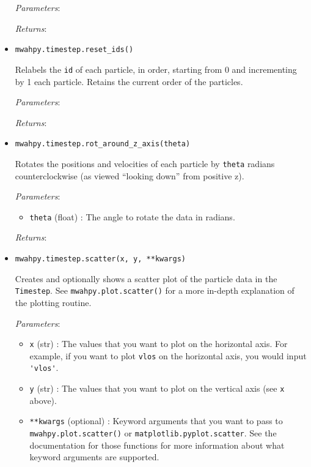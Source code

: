 \documentclass{article}
\begin{document}
\begin{itemize}
\textit{Parameters}: 

\textit{Returns}: 



\item \verb!mwahpy.timestep.reset_ids()!

Relabels the \verb!id! of each particle, in order, starting from 0 and incrementing by 1 each particle. Retains the current order of the particles. 

\textit{Parameters}: 

\textit{Returns}: 



\item \verb!mwahpy.timestep.rot_around_z_axis(theta)!

Rotates the positions and velocities of each particle by \verb!theta! radians counterclockwise (as viewed ``looking down'' from positive z). 

\textit{Parameters}: \begin{itemize}

\item \verb!theta! (float) : The angle to rotate the data in radians.

\end{itemize}

\textit{Returns}: 



\item \verb!mwahpy.timestep.scatter(x, y, **kwargs)!

Creates and optionally shows a scatter plot of the particle data in the \verb!Timestep!. See \verb!mwahpy.plot.scatter()! for a more in-depth explanation of the plotting routine.

\textit{Parameters}: \begin{itemize}

\item \verb!x! (str) : The values that you want to plot on the horizontal axis. For example, if you want to plot \verb!vlos! on the horizontal axis, you would input \verb!'vlos'!.

\item \verb!y! (str) : The values that you want to plot on the vertical axis (see \verb!x! above).

\item \verb!**kwargs! (optional) : Keyword arguments that you want to pass to \verb!mwahpy.plot.scatter()! or \verb!matplotlib.pyplot.scatter!. See the documentation for those functions for more information about what keyword arguments are supported.


\end{itemize}
\end{itemize}
\end{document}
